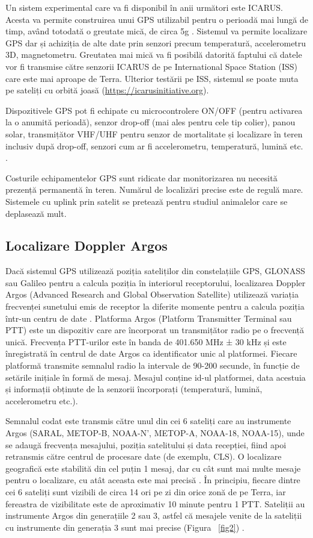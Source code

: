 \documentclass[11pt,onehalfspacing]{elife}
\begin{document}
Un sistem experimental care va fi disponibil în anii următori este ICARUS. Acesta va permite construirea unui GPS utilizabil pentru o perioadă mai lungă de timp, având totodată o greutate mică, de circa 5g \citep{Bridge2011}. Sistemul va permite localizare GPS dar și achiziția de alte date prin senzori precum temperatură, accelerometru 3D, magnetometru. Greutatea mai mică va fi posibilă datorită faptului că datele vor fi transmise către senzorii ICARUS de pe International Space Station (ISS) care este mai aproape de Terra. Ulterior testării pe ISS, sistemul se poate muta pe sateliți cu orbită joasă (\url{https://icarusinitiative.org}).

Dispozitivele GPS pot fi echipate cu microcontrolere ON/OFF (pentru activarea la o anumită perioadă), senzor drop-off (mai ales pentru cele tip colier), panou solar, transmițător VHF/UHF pentru senzor de mortalitate și localizare în teren inclusiv după drop-off, senzori cum ar fi accelerometru, temperatură, lumină etc. \citep{Madry2015}.

Costurile echipamentelor GPS sunt ridicate dar monitorizarea nu necesită prezență permanentă în teren. Numărul de localizări precise este de regulă mare. Sistemele cu uplink prin satelit se pretează pentru studiul animalelor care se deplasează mult.

\subsection{Localizare Doppler Argos}
Dacă sistemul GPS utilizează poziția sateliților din constelațiile GPS, GLONASS sau Galileo pentru a calcula poziția în interiorul receptorului, localizarea Doppler Argos (Advanced Research and Global Observation Satellite) utilizează variația frecvenței sunetului emis de receptor la diferite momente pentru a calcula poziția într-un centru de date \citep{Thomas2012}. Platforma Argos (Platform Transmitter Terminal sau PTT) este un dispozitiv care are încorporat un transmițător radio pe o frecvență unică. Frecvența PTT-urilor este în banda de 401.650 MHz ± 30 kHz și este înregistrată în centrul de date Argos ca identificator unic al platformei. Fiecare platformă transmite semnalul radio la intervale de 90-200 secunde, în funcție de setările inițiale în formă de mesaj. Mesajul conține id-ul platformei, data acestuia și informații obținute de la senzorii încorporați (temperatură, lumină, accelerometru etc.).

Semnalul codat este transmis către unul din cei 6 sateliți care au instrumente Argos (SARAL, METOP-B, NOAA-N', METOP-A, NOAA-18, NOAA-15), unde se adaugă frecvența mesajului, poziția satelitului și data recepției, fiind apoi retransmis către centrul de procesare date (de exemplu, CLS). O localizare geografică este stabilită din cel puțin 1 mesaj, dar cu cât sunt mai multe mesaje pentru o localizare, cu atât aceasta este mai precisă \citep{CLS2016}. În principiu, fiecare dintre cei 6 sateliți sunt vizibili de circa 14 ori pe zi din orice zonă de pe Terra, iar fereastra de vizibilitate este de aproximativ 10 minute pentru 1 PTT. Sateliții au instrumente Argos din generațiile 2 sau 3, astfel că mesajele venite de la sateliții cu instrumente din generația 3 sunt mai precise (Figura ~\ref{fig2}) \citep{CLS2016}.
\end{document}
